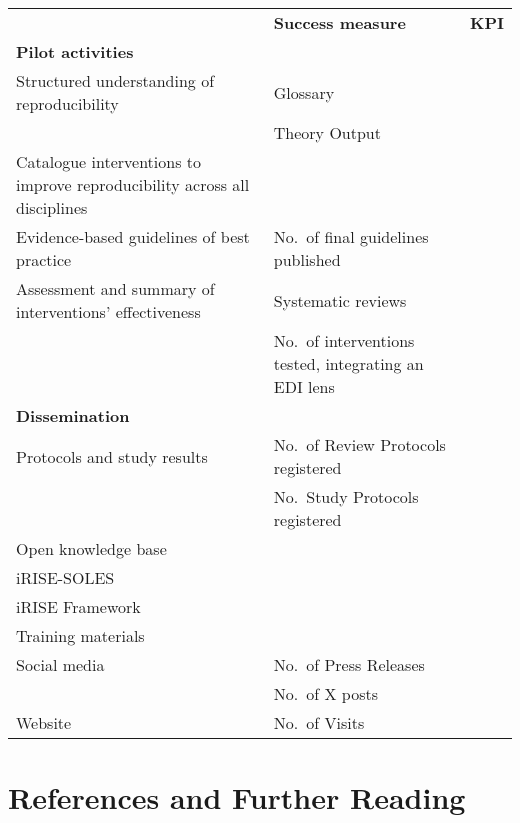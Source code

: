 \documentclass[
]{article}
\begin{document}
\begin{longtable}[]{@{}
  >{\raggedright\arraybackslash}p{}
  >{\raggedright\arraybackslash}p{}
  >{\raggedright\arraybackslash}p{}@{}}
\toprule()
\endhead
& \textbf{Success measure} & \textbf{KPI} \\
\textbf{Pilot activities} & & \\
Structured understanding of reproducibility & Glossary & \\
& Theory Output & \\
Catalogue interventions to improve reproducibility across all disciplines & & \\
Evidence-based guidelines of best practice & No.~of final guidelines published & \\
Assessment and summary of interventions' effectiveness & Systematic reviews & \\
& No.~of interventions tested, integrating an EDI lens & 4 \\
\textbf{Dissemination} & & \\
Protocols and study results & No.~of Review Protocols registered & \\
& No.~Study Protocols registered & \\
Open knowledge base & & \\
iRISE-SOLES & & \\
iRISE Framework & & \\
Training materials & & \\
Social media & No.~of Press Releases & \\
& No.~of X posts & \\
Website & No.~of Visits & \\
\bottomrule()
\end{longtable}

\hypertarget{references-and-further-reading}{%
\section{\texorpdfstring{\textbf{References and Further Reading}}{References and Further Reading}}\label{references-and-further-reading}}
\end{document}
